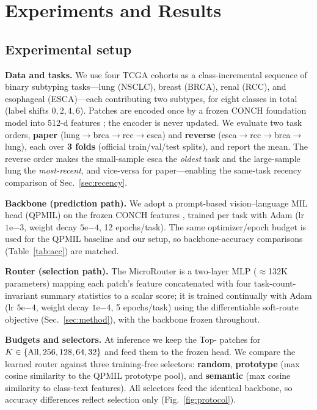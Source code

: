\section{Experiments and Results}
\label{sec:exp}

\subsection{Experimental setup}
\textbf{Data and tasks.} We use four TCGA cohorts as a class-incremental
sequence of binary subtyping tasks---lung (NSCLC), breast (BRCA), renal (RCC),
and esophageal (ESCA)---each contributing two subtypes, for eight classes in
total (label shifts $0,2,4,6$). Patches are encoded once by a frozen CONCH
foundation model into 512-d features \cite{lu2024conch}; the encoder is never
updated. We evaluate two task orders, \textbf{paper} (lung$\to$brca$\to$rcc$\to$esca)
and \textbf{reverse} (esca$\to$rcc$\to$brca$\to$lung), each over \textbf{3 folds}
(official train/val/test splits), and report the mean. The reverse order makes
the small-sample esca the \emph{oldest} task and the large-sample lung the
\emph{most-recent}, and vice-versa for paper---enabling the same-task recency
comparison of Sec.~\ref{sec:recency}.

\noindent\textbf{Backbone (prediction path).} We adopt a prompt-based
vision--language MIL head (QPMIL) on the frozen CONCH features
\cite{gou2025qpmil}, trained per task with Adam (lr $1\mathrm{e}{-3}$, weight
decay $5\mathrm{e}{-4}$, 12 epochs/task). The same optimizer/epoch budget is
used for the QPMIL baseline and our setup, so backbone-accuracy comparisons
(Table~\ref{tab:acc}) are matched.

\noindent\textbf{Router (selection path).} The MicroRouter is a two-layer MLP
($\approx$132K parameters) mapping each patch's feature concatenated with four
task-count-invariant summary statistics to a scalar score; it is trained
continually with Adam (lr $5\mathrm{e}{-4}$, weight decay $1\mathrm{e}{-4}$, 5
epochs/task) using the differentiable soft-route objective
(Sec.~\ref{sec:method}), with the backbone frozen throughout.

\noindent\textbf{Budgets and selectors.} At inference we keep the Top-\K{}
patches for $K\in\{\text{All},256,128,64,32\}$ and feed them to the frozen
head. We compare the learned router against three training-free selectors:
\textbf{random}, \textbf{prototype} (max cosine similarity to the QPMIL
prototype pool), and \textbf{semantic} (max cosine similarity to class-text
features). All selectors feed the identical backbone, so accuracy differences
reflect selection only (Fig.~\ref{fig:protocol}).

